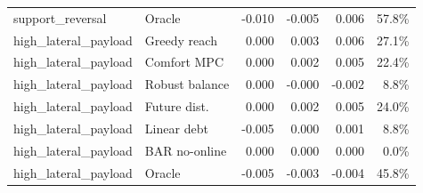 \begin{table}[t]
\begin{tabular}{llrrrr}
support\_reversal & Oracle & -0.010 & -0.005 & 0.006 & 57.8\% \\
high\_lateral\_payload & Greedy reach & 0.000 & 0.003 & 0.006 & 27.1\% \\
high\_lateral\_payload & Comfort MPC & 0.000 & 0.002 & 0.005 & 22.4\% \\
high\_lateral\_payload & Robust balance & 0.000 & -0.000 & -0.002 & 8.8\% \\
high\_lateral\_payload & Future dist. & 0.000 & 0.002 & 0.005 & 24.0\% \\
high\_lateral\_payload & Linear debt & -0.005 & 0.000 & 0.001 & 8.8\% \\
high\_lateral\_payload & BAR no-online & 0.000 & 0.000 & 0.000 & 0.0\% \\
high\_lateral\_payload & Oracle & -0.005 & -0.003 & -0.004 & 45.8\% \\
\bottomrule
\end{tabular}
\end{table}

